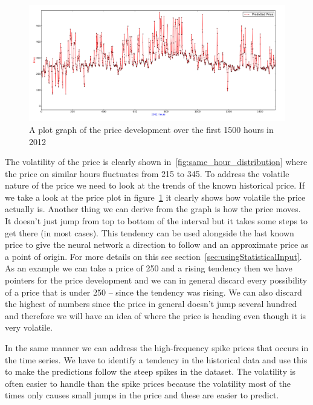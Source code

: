 \begin{figure}[H]
\centering
\includegraphics[width=\textwidth ]{billeder/energy_price_plots/plotGraph.jpg}
\caption{A plot graph of the price development over the first 1500 hours in 2012}
\label{fig:plotGraph}
\end{figure}

The volatility of the price is clearly shown in~\ref{fig:same_hour_distribution} where the price on similar hours fluctuates from 215 to 345. To address the volatile nature of the price we need to look at the trends of the known historical price. If we take a look at the price plot in figure~\ref{fig:plotGraph} it clearly shows how volatile the price actually is. Another thing we can derive from the graph is how the price moves. It doesn't just jump from top to bottom of the interval but it takes some steps to get there (in most cases). This tendency can be used alongside the last known price to give the neural network a direction to follow and an approximate price as a point of origin. For more details on this see section~\ref{sec:usingStatisticalInput}. As an example we can take a price of 250 and a rising tendency then we have pointers for the price development and we can in general discard every possibility of a price that is under 250 -- since the tendency was rising. We can also discard the highest of numbers since the price in general doesn't jump several hundred and therefore we will have an idea of where the price is heading even though it is very volatile.

In the same manner we can address the high-frequency spike prices that occurs in the time series. We have to identify a tendency in the historical data and use this to make the predictions follow the steep spikes in the dataset. The volatility is often easier to handle than the spike prices because the volatility most of the times only causes small jumps in the price and these are easier to predict.


